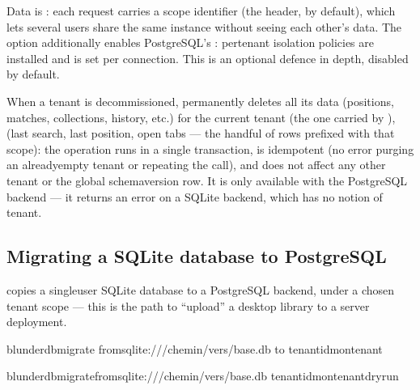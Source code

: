 \documentclass[letterpaper,10pt,english]{sphinxmanual}
\begin{document}
\sphinxAtStartPar
Data is : each request carries a scope identifier (the  header,  by default), which lets several users share the same instance without seeing each other’s data. The  option additionally enables PostgreSQL’s : per\sphinxhyphen{}tenant isolation policies are installed and  is set per connection. This is an optional defence in depth, disabled by default.

\sphinxAtStartPar
When a tenant is decommissioned,  permanently deletes all its data (positions, matches, collections, history, etc.) for the current tenant (the one carried by ),  (last search, last position, open tabs — the handful of  rows prefixed with that scope): the operation runs in a single transaction, is idempotent (no error purging an already\sphinxhyphen{}empty tenant or repeating the call), and does not affect any other tenant or the global schema\sphinxhyphen{}version row. It is only available with the PostgreSQL backend — it returns an  error on a SQLite backend, which has no notion of tenant.


\subsection{Migrating a SQLite database to PostgreSQL}
\label{\detokenize{mode_headless:migrer-une-base-sqlite-vers-postgresql}}\label{\detokenize{mode_headless:headless-migrate}}
\sphinxAtStartPar
{} copies a single\sphinxhyphen{}user SQLite database to a PostgreSQL backend, under a chosen tenant scope — this is the path to “upload” a desktop library to a server deployment.

\begin{sphinxVerbatim}[commandchars=\\\{\}]
blunderdbmigrate
\PYGZhy{}\PYGZhy{}fromsqlite:///chemin/vers/base.db
\PYGZhy{}\PYGZhy{}to
\PYGZhy{}\PYGZhy{}tenant\PYGZhy{}idmon\PYGZhy{}tenant

blunderdbmigrate\PYGZhy{}\PYGZhy{}fromsqlite:///chemin/vers/base.db
\PYGZhy{}\PYGZhy{}tenant\PYGZhy{}idmon\PYGZhy{}tenant\PYGZhy{}\PYGZhy{}dry\PYGZhy{}run
\end{sphinxVerbatim}
\end{document}

